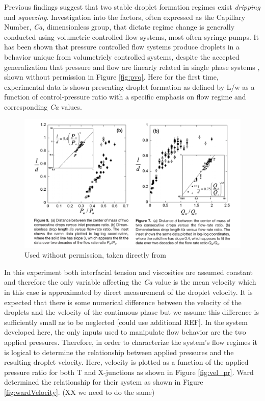 Previous findings suggest that two stable droplet formation regimes exist \emph{dripping} and \emph{squeezing}. Investigation into the factors, often expressed as the Capillary Number, \emph{Ca}, dimensionless group, that dictate regime change is generally conducted using volumetric controlled flow systems, most often syringe pumps. It has been shown that pressure controlled flow systems produce droplets in a behavior unique from volumetricly controlled systems, despite the accepted generalization that pressure and flow are linearly related in single phase systems \cite{Ward2005}, shown without permission in Figure \vref{fig:pvq}. Here for the first time, experimental data is shown presenting droplet formation as defined by L/w as a function of control-pressure ratio with a specific emphasis on flow regime and corresponding \emph{Ca} values.

\begin{figure}[h]
\centering 
\includegraphics[width=01.0\columnwidth]{pvq.PNG} 
\caption[Droplet Length as a Function of Applied Control Pressure Ratio]{Used without permission, taken directly from \cite{Ward2005} }
\label{fig:pvq} 
\end{figure}

In this experiment both interfacial tension and viscosities are assumed constant and therefore the only variable affecting the \emph{Ca} value is the mean velocity which in this case is approximated by direct measurement of the droplet velocity. It is expected that there is some numerical difference between the velocity of the droplets and the velocity of the continuous phase but we assume this difference is sufficiently small as to be neglected\cite{Ward2005} [could use additional  REF]. In the system developed here, the only inputs used to manipulate flow behavior are the two applied pressures. Therefore, in order to characterize the system's flow regimes it is logical to determine the relationship between applied pressures and the resulting droplet velocity. Here, velocity is plotted as a function of the applied pressure ratio for both T and X-junctions as shown in Figure \vref{fig:vel_pr}.  Ward determined the relationship for their system as shown in Figure \vref{fig:wardVelocity}. (XX we need to do the same)

